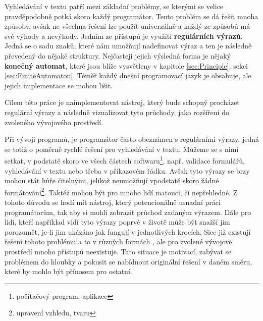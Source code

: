 Vyhledávání v textu patří mezi základní problémy, se kterými se velice pravděpodobně potká skoro každý programátor. 
Tento problém se dá řešit mnoha způsoby, avšak ne všechna řešení lze použít univerzálně a každý ze způsobů má své výhody a nevýhody.
Jedním ze přístupů je využití \textbf{regulárních výrazů}. 
Jedná se o sadu znaků, které nám umožňují nadefinovat výraz a ten je následně převedený do nějaké struktury. 
Nejčasteji jejich výsledná forma je nějaký \textbf{konečný automat}, které jsou blíže vysvětleny v kapitole \ref{sec:Principle}, sekci \ref{sec:FiniteAutomaton}.
Téměř každý dnešní programovací jazyk je obsahuje, ale jejich implementace se mohou lišit.

Cílem této práce je naimplementovat nástroj, který bude schopný procházet regulární výrazy a následně vizualizovat tyto průchody, jako rozšíření do zvoleného vývojového prostředí.

Při vývoji programů, je programátor často obeznámen s regulárními výrazy, jedná se totiž o poměrně rychlé řešení pro vyhledávání v textu. 
Můžeme se s nimi setkat, v podstatě skoro ve všech částech softwaru\footnote{počítačový program, aplikace}, např. validace formulářů, vyhledávání v textu nebo třeba v příkazovém řádku.
Avšak tyto výrazy se brzy mohou stát hůře čitelnými, jelikož neumožňují vpodstatě skoro žádné formátování\footnote{upravení vzhledu, tvaru}. 
Taktéž mohou být pro mnoho lidí matoucí, či nepřehledné.
Z tohoto důvodu se hodí mít nástroj, který potencionálně usnadní práci programátorům, tak aby si mohli zobrazit průchod zadaným výrazem.
Dále pro lidi, kteří například vidí tyto výrazy poprvé v životě může být snažší jim porozumět, je-li jim ukázáno jak fungují v jednotlivých krocích.
Sice již existují řešení tohoto problému a to v různých formách \cite{Dib, Regexper, RegExr}, ale pro zvolené vývojové prostředí mnoho přístupů neexistuje.
Tato situace je motivací, zabývat se problémem do hloubky a pokusit se nabídnout originální řešení v daném směru, které by mohlo být přínosem pro ostatní.

